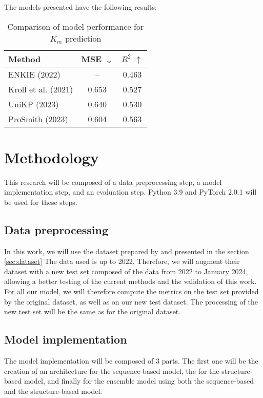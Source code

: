 The models presented have the following results:

\begin{table}[ht]
  \centering
  \begin{tabular}{lcc}
    \hline
    \textbf{Method} & \textbf{MSE \(\downarrow\)} & \textbf{\(R^2\) \(\uparrow\)} \\
    \hline
    ENKIE (2022) & -- & 0.463 \\
    Kroll et al. (2021) & 0.653 & 0.527 \\
    UniKP (2023) & 0.640 & 0.530 \\
    ProSmith (2023) & 0.604 & 0.563 \\
    \hline
  \end{tabular}
  \caption{Comparison of model performance for $K_m$ prediction}
  \label{tab:model_performance}
\end{table}


\section{Methodology}
This research will be composed of a data preprocessing step, a model implementation step, and an
evaluation step. Python 3.9 and PyTorch 2.0.1 will be used for these steps.

\subsection{Data preprocessing}
In this work, we will use the dataset prepared by \citeauthor{km1} and presented in the section \ref{sec:dataset}
The data used is up to 2022. Therefore, we will augment their dataset with a new test set composed of
the data from 2022 to January 2024, allowing a better testing of the current methods and the validation
of this work.
For all our model, we will therefore compute the metrics on the test set provided by the original dataset,
as well as on our new test dataset.
The processing of the new test set will be the same as for the original dataset.

\subsection{Model implementation}
The model implementation will be composed of 3 parts. The first one will be the creation of an architecture
for the sequence-based model, the for the structure-based model, and finally for the ensemble model using both
the sequence-based and the structure-based model.

